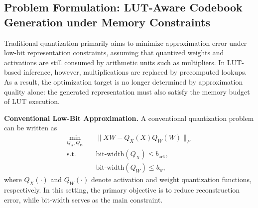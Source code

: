     


\subsection{Problem Formulation: LUT-Aware Codebook Generation under Memory Constraints}

Traditional quantization primarily aims to minimize approximation error under low-bit representation constraints, assuming that quantized weights and activations are still consumed by arithmetic units such as multipliers. In LUT-based inference, however, multiplications are replaced by precomputed lookups. As a result, the optimization target is no longer determined by approximation quality alone: the generated representation must also satisfy the memory budget of LUT execution.

\textbf{Conventional Low-Bit Approximation.} A conventional quantization problem can be written as
\begin{equation}
\begin{aligned}
\min_{Q_X,Q_W} \quad & \|XW - Q_X(X)Q_W(W)\|_F \\
\text{s.t.} \quad & \text{bit-width}(Q_X) \leq b_{\text{act}}, \\
& \text{bit-width}(Q_W) \leq b_{\text{w}},
\end{aligned}
\end{equation}
where $Q_X(\cdot)$ and $Q_W(\cdot)$ denote activation and weight quantization functions, respectively. In this setting, the primary objective is to reduce reconstruction error, while bit-width serves as the main constraint.

